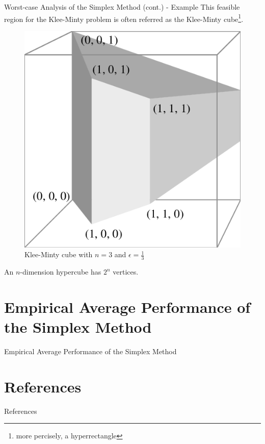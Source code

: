 \documentclass[10pt]{beamer}
\begin{document}
\begin{frame}{Worst-case Analysis of the Simplex Method (cont.) - Example}
This feasible region for the Klee-Minty problem is often referred as the Klee-Minty cube\footnote{more percisely, a hyperrectangle}.
\begin{figure}
	\includegraphics[scale=.2]{img/klee-minty-cube.png}
	\caption{Klee-Minty cube with $n = 3$ and $\epsilon = \frac{1}{3}$}
\end{figure}
An $n$-dimension hypercube has $2^n$ vertices.
\end{frame}


\section{Empirical Average Performance of the Simplex Method}
\begin{frame}{Empirical Average Performance of the Simplex Method}

\end{frame}

\section{References}
\begin{frame}[allowframebreaks]{References}
\printbibliography
\end{frame}
\end{document}
